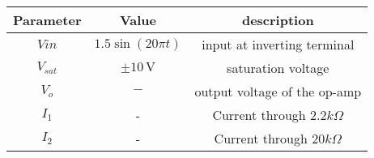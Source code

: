 \begin{tabular}{|c|c|c|}
    \hline
    \textbf{Parameter} & \textbf{Value} & \textbf{description} \\ 
    \hline
    $Vin$ & $1.5 \sin(20\pi t)$ & input at inverting terminal \\
    \hline
    $V_{sat}$ & $\pm 10 \, \text{V}$ & saturation voltage\\
    \hline
    $V_{o}$ & $-$ & output voltage of the op-amp \\
    \hline
    $I_1$ & - & Current through $2.2k\Omega$  \\
    \hline
    $I_2$ & - & Current through $20k\Omega$  \\
    \hline
\end{tabular}

